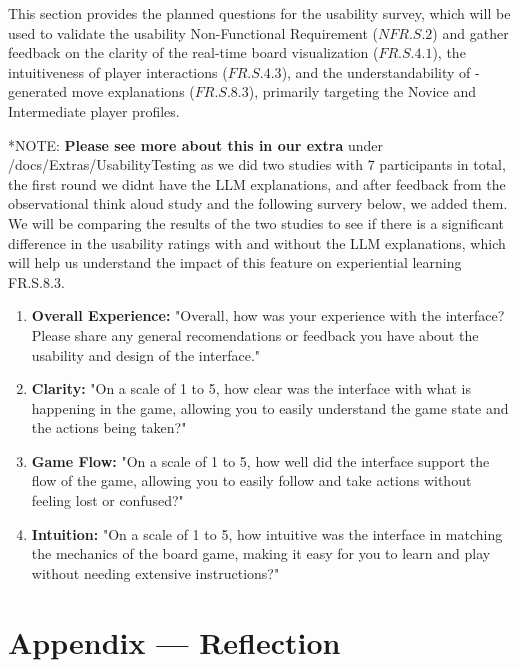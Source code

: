 \documentclass[12pt, titlepage]{article}
\begin{document}
This section provides the planned questions for the usability survey, which will be used to validate the usability Non-Functional Requirement ($\hyperref[NFR.S.2]{NFR.S.2}$) and gather feedback on the clarity of the real-time board visualization ($\hyperref[FR.S.4.1]{FR.S.4.1}$), the intuitiveness of player interactions ($\hyperref[FR.S.4.3]{FR.S.4.3}$), and the understandability of \AI{}-generated move explanations ($\hyperref[FR.S.8.3]{FR.S.8.3}$), primarily targeting the Novice and Intermediate player profiles.
\medskip

*NOTE: \textbf{Please see more about this in our extra} under \\
/docs/Extras/UsabilityTesting as we did two studies with 7 participants in total, 
the first round we didnt have the LLM explanations, and after feedback from the 
observational think aloud study and the following survery below, we added them. We will be comparing
 the results of the two studies to see if there is a significant difference in the
  usability ratings with and without the LLM explanations, which will help us understand 
  the impact of this feature on experiential learning FR.S.8.3. \\

\begin{enumerate}
    \item \textbf{Overall Experience:} "Overall, how was your experience with the interface? Please share any general recomendations or feedback you have about the usability and design of the interface."
    \item \textbf{Clarity:} "On a scale of 1 to 5, how clear was the interface with what is happening in the game, allowing you to easily understand the game state and the actions being taken?"
    \item \textbf{Game Flow:} "On a scale of 1 to 5, how well did the interface support the flow of the game, allowing you to easily follow and take actions without feeling lost or confused?"
    \item \textbf{Intuition:} "On a scale of 1 to 5, how intuitive was the interface in matching the mechanics of the board game, making it easy for you to learn and play without needing extensive instructions?" 
\end{enumerate}


\newpage{}
\section*{Appendix --- Reflection}
\end{document}
